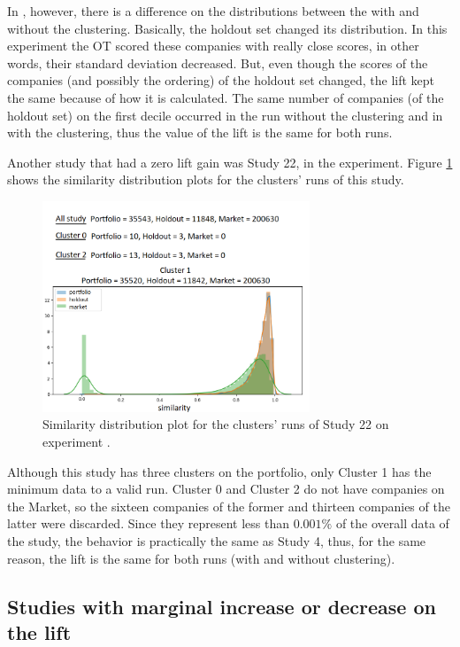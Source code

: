 In \nameExperimentII{}, however, there is a difference on the distributions between the with and without the clustering. Basically, the holdout set changed its distribution. In this experiment the OT scored these companies with really close scores, in other words, their standard deviation decreased. But, even though the scores of the companies (and possibly the ordering) of the holdout set changed, the lift kept the same because of how it is calculated. The same number of companies (of the holdout set) on the first decile occurred in the run without the clustering and in with the clustering, thus the value of the lift is the same for both runs.

Another study that had a zero lift gain was Study 22, in the \nameExperimentI{} experiment. Figure \ref{fig:study-22-clusters-simi-plot} shows the similarity distribution plots for the clusters' runs of this study.

\begin{figure}[!ht]
   \centering
   \includegraphics[width=8cm   ]{fig/ch4-study-22-clusters-simi-plot.png}
   \caption{Similarity distribution plot for the clusters' runs of Study 22 on experiment \nameExperimentI{}.}
   \label{fig:study-22-clusters-simi-plot}
\end{figure}

Although this study has three clusters on the portfolio, only Cluster 1 has the minimum data to a valid run. Cluster 0 and Cluster 2 do not have companies on the Market, so the sixteen companies of the former and thirteen companies of the latter were discarded. Since they represent less than $0.001\%$ of the overall data of the study, the behavior is practically the same as Study 4, thus, for the same reason, the lift is the same for both runs (with and without clustering).

\subsection{Studies with marginal increase or decrease on the lift}
\label{ch:marginal-change}

